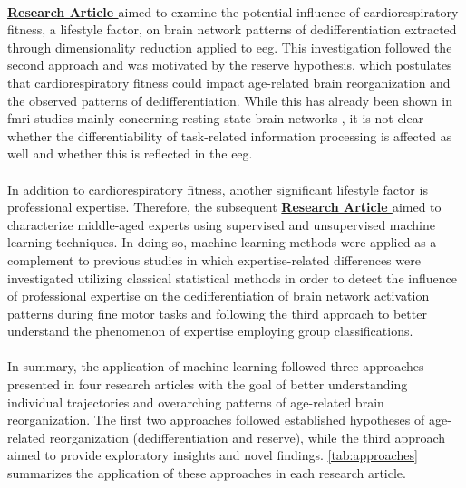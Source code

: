 \\
\textbf{\hyperref[pub:paperIII]{Research Article }} aimed to examine the potential influence of cardiorespiratory fitness, a lifestyle factor, on brain network patterns of dedifferentiation extracted through dimensionality reduction applied to \gls{eeg}. This investigation followed the second approach and was motivated by the reserve hypothesis, which postulates that cardiorespiratory fitness could impact age-related brain reorganization and the observed patterns of dedifferentiation. While this has already been shown in \gls{fmri} studies mainly concerning resting-state brain networks \cite{Stillman2019}, it is not clear whether the differentiability of task-related information processing is affected as well and whether this is reflected in the \gls{eeg}.\\
\\
In addition to cardiorespiratory fitness, another significant lifestyle factor is professional expertise. Therefore, the subsequent \textbf{\hyperref[pub:paperIV]{Research Article }} aimed to characterize middle-aged experts using supervised and unsupervised machine learning techniques. In doing so, machine learning methods were applied as a complement to previous studies in which expertise-related differences were investigated utilizing classical statistical methods \cite{Vieluf2018, Goelz2018} in order to detect the influence of professional expertise on the dedifferentiation of brain network activation patterns during fine motor tasks and following the third approach to better understand the phenomenon of expertise employing group classifications.\\
\\
In summary, the application of machine learning followed three approaches presented in four research articles with the goal of better understanding individual trajectories and overarching patterns of age-related brain reorganization. The first two approaches followed established hypotheses of age-related reorganization (dedifferentiation and reserve), while the third approach aimed to provide exploratory insights and novel findings. \autoref{tab:approaches} summarizes the application of these approaches in each research article.

